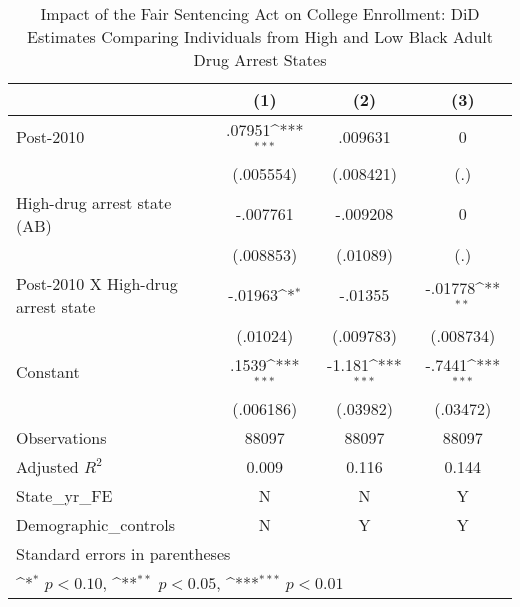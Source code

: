 \begin{table}[htbp]\centering
\def\sym#1{\ifmmode^{#1}\else\(^{#1}\)\fi}
\caption{Impact of the Fair Sentencing Act on College Enrollment: DiD Estimates Comparing Individuals from High and Low Black Adult Drug Arrest States}
\begin{tabular}{l*{3}{c}}
\hline\hline
                    &\multicolumn{1}{c}{(1)}         &\multicolumn{1}{c}{(2)}         &\multicolumn{1}{c}{(3)}         \\
\hline
Post-2010           &      .07951\sym{***}&     .009631         &           0         \\
                    &   (.005554)         &   (.008421)         &         (.)         \\
[1em]
High-drug arrest state (AB)&    -.007761         &    -.009208         &           0         \\
                    &   (.008853)         &    (.01089)         &         (.)         \\
[1em]
Post-2010 X High-drug arrest state&     -.01963\sym{*}  &     -.01355         &     -.01778\sym{**} \\
                    &    (.01024)         &   (.009783)         &   (.008734)         \\
[1em]
Constant            &       .1539\sym{***}&      -1.181\sym{***}&      -.7441\sym{***}\\
                    &   (.006186)         &    (.03982)         &    (.03472)         \\
\hline
Observations        &       88097         &       88097         &       88097         \\
Adjusted \(R^{2}\)  &       0.009         &       0.116         &       0.144         \\
State\_yr\_FE         &           N         &           N         &           Y         \\
Demographic\_controls&           N         &           Y         &           Y         \\
\hline\hline
\multicolumn{4}{l}{\footnotesize Standard errors in parentheses}\\
\multicolumn{4}{l}{\footnotesize \sym{*} \(p<0.10\), \sym{**} \(p<0.05\), \sym{***} \(p<0.01\)}\\
\end{tabular}
\end{table}
